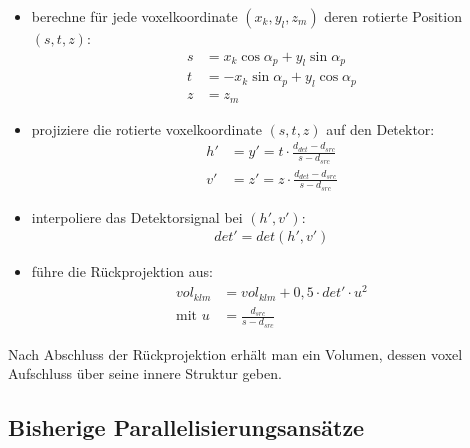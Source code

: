 \begin{itemize}
    \item berechne für jede \gls{voxel}koordinate $(x_k, y_l, z_m)$ deren rotierte Position $(s, t, z)$:
        \begin{equation}
            \begin{aligned}
                s &= x_k \cos \alpha_p + y_l \sin \alpha_p\\
                t &= -x_k \sin \alpha_p + y_l \cos \alpha_p\\
                z &= z_m
            \end{aligned}
        \end{equation}

    \item projiziere die rotierte \gls{voxel}koordinate $(s, t, z)$ auf den Detektor:
        \begin{equation}
            \begin{aligned}
                h' &= y' = t \cdot \frac{d_{det} - d_{src}}{s - d_{src}}\\
                v' &= z' = z \cdot \frac{d_{det} - d_{src}}{s - d_{src}}
            \end{aligned}
        \end{equation}

    \item interpoliere das Detektorsignal bei $(h', v')$:
        \begin{equation}
            \begin{aligned}
                det' = det(h', v')
            \end{aligned}
        \end{equation}

    \item führe die Rückprojektion aus:
        \begin{equation}
            \begin{aligned}
                vol_{klm} &= vol_{klm} + 0,5 \cdot det' \cdot u^2\\
                \text{mit } u &= \frac{d_{src}}{s - d_{src}}
            \end{aligned}
        \end{equation}
\end{itemize}

Nach Abschluss der Rückprojektion erhält man ein Volumen, dessen \gls{voxel} Aufschluss über seine innere Struktur
geben.

\subsection{Bisherige Parallelisierungsansätze}

